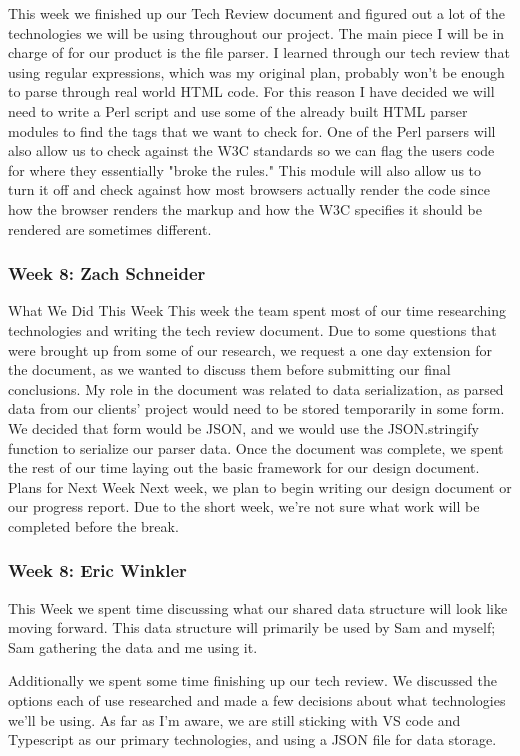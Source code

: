 This week we finished up our Tech Review document and figured out a lot of the technologies we will be using throughout our project. The main piece I will be in charge of for our product is the file parser. I learned through our tech review that using regular expressions, which was my original plan, probably won't be enough to parse through real world HTML code. For this reason I have decided we will need to write a Perl script and use some of the already built HTML parser modules to find the tags that we want to check for. One of the Perl parsers will also allow us to check against the W3C standards so we can flag the users code for where they essentially "broke the rules." This module will also allow us to turn it off and check against how most browsers actually render the code since how the browser renders the markup and how the W3C specifies it should be rendered are sometimes different.

\subsubsection{Week 8: Zach Schneider}

What We Did This Week
This week the team spent most of our time researching technologies and writing the tech review document. Due to some questions that were brought up from some of our research, we request a one day extension for the document, as we wanted to discuss them before submitting our final conclusions. My role in the document was related to data serialization, as parsed data from our clients' project would need to be stored temporarily in some form. We decided that form would be JSON, and we would use the JSON.stringify function to serialize our parser data. Once the document was complete, we spent the rest of our time laying out the basic framework for our design document.
Plans for Next Week
Next week, we plan to begin writing our design document or our progress report. Due to the short week, we're not sure what work will be completed before the break. 

\subsubsection{Week 8: Eric Winkler}

This Week we spent time discussing what our shared data structure will look like moving forward. This data structure will primarily be used by Sam and myself; Sam gathering the data and me using it.

Additionally we spent some time finishing up our tech review. We discussed the options each of use researched and made a few decisions about what technologies we'll be using. As far as I'm aware, we are still sticking with VS code and Typescript as our primary technologies, and using a JSON file for data storage.

